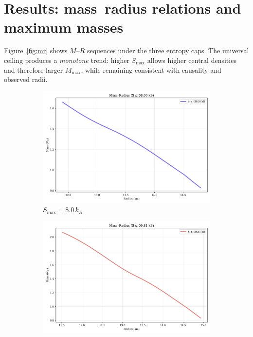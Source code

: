 \documentclass[11pt]{article}
\begin{document}
\section{Results: mass--radius relations and maximum masses}
\label{sec:mr}
Figure~\ref{fig:mr} shows $M$--$R$ sequences under the three entropy caps. The universal ceiling produces a \emph{monotone} trend: higher $S_{\max}$ allows higher central densities and therefore larger $M_{\max}$, while remaining consistent with causality and observed radii.

\begin{figure}[h!]
\centering
\begin{subfigure}[t]{0.32\textwidth}
\includegraphics[width=\textwidth]{mass_radius_curve_08.00kB.png}
\caption{$S_{\max}=8.0\,k_B$}
\end{subfigure}\hfill
\begin{subfigure}[t]{0.32\textwidth}
\includegraphics[width=\textwidth]{mass_radius_curve_09.81kB.png}

\end{subfigure}
\end{figure}
\end{document}
